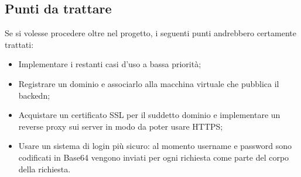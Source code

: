 \subsection{Punti da trattare}
Se si volesse procedere oltre nel progetto, i seguenti punti andrebbero certamente trattati:
\begin{itemize}
  \item Implementare i restanti casi d'uso a bassa priorità;
  \item Registrare un dominio e associarlo alla macchina virtuale che pubblica il backedn;
  \item Acquistare un certificato SSL per il suddetto dominio e implementare un reverse proxy sui server in modo da poter usare HTTPS;
  \item Usare un sistema di login più sicuro: al momento username e password sono codificati in Base64 vengono inviati per ogni richiesta come parte del corpo della richiesta.
\end{itemize}